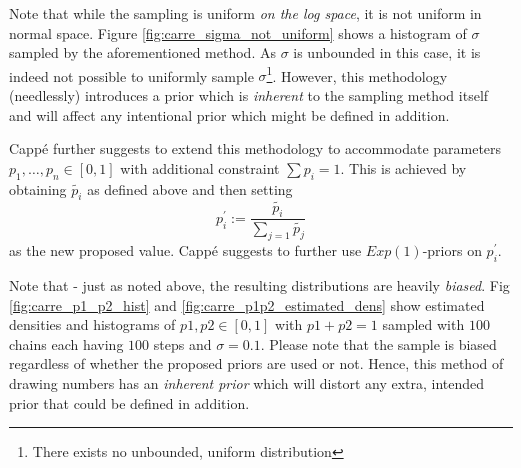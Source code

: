 	 Note that while the sampling is uniform \textit{on the log space}, it is not uniform in normal space. Figure \ref{fig:carre_sigma_not_uniform} shows a histogram of $\sigma$ sampled by the aforementioned method. As $\sigma$ is unbounded in this case, it is indeed not possible to uniformly sample $\sigma$\footnote{There exists no unbounded, uniform distribution}. However, this methodology (needlessly) introduces a prior which is \textit{inherent} to the sampling method itself and will affect any intentional prior which might be defined in addition. 
	 
	 Cappé \cite{cappe2003} further suggests to extend this methodology to accommodate parameters $p_1, \dots, p_n \in [0,1]$ with additional constraint $\sum p_i = 1$. This is achieved by obtaining $\tilde{p_i}$ as defined above and then setting
	 \[
	 	p_i^{\prime} := \frac{\tilde{p_i}}{\sum_{j=1} \tilde{p_j}}
	 \]
	 as the new proposed value. Cappé suggests to further use $Exp(1)$-priors on $p_i^{\prime}$. 
	 
	 Note that - just as noted above, the resulting distributions are heavily \textit{biased}. Fig \ref{fig:carre_p1_p2_hist} and \ref{fig:carre_p1p2_estimated_dens} show estimated densities and histograms of $p1, p2 \in [0,1]$ with $p1 + p2 = 1$ sampled with $100$ chains each having $100$ steps and $\sigma = 0.1$. Please note that the sample is biased regardless of whether the proposed priors are used or not. Hence, this method of drawing numbers has an \textit{inherent prior} which will distort any extra, intended prior that could be defined in addition. 
	 
	 
 
